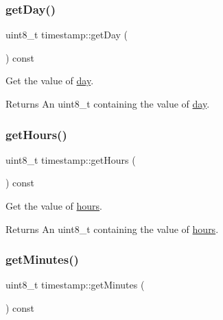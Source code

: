 \subsubsection{\texorpdfstring{get\+Day()}{getDay()}}
{\footnotesize\ttfamily uint8\+\_\+t timestamp\+::get\+Day (\begin{DoxyParamCaption}{ }\end{DoxyParamCaption}) const}



Get the value of \mbox{\hyperlink{classtimestamp_a0102d6c44b2cc194a8186a42ff2bd58b}{day}}. 

\begin{DoxyReturn}{Returns}
An uint8\+\_\+t containing the value of \mbox{\hyperlink{classtimestamp_a0102d6c44b2cc194a8186a42ff2bd58b}{day}}. 
\end{DoxyReturn}
\mbox{\label{classtimestamp_a9857c77d68def8f77737f3c3840b6b95}} 
\subsubsection{\texorpdfstring{get\+Hours()}{getHours()}}
{\footnotesize\ttfamily uint8\+\_\+t timestamp\+::get\+Hours (\begin{DoxyParamCaption}{ }\end{DoxyParamCaption}) const}



Get the value of \mbox{\hyperlink{classtimestamp_a3b2f11626563cca00d60b323ceb15191}{hours}}. 

\begin{DoxyReturn}{Returns}
An uint8\+\_\+t containing the value of \mbox{\hyperlink{classtimestamp_a3b2f11626563cca00d60b323ceb15191}{hours}}. 
\end{DoxyReturn}
\mbox{\label{classtimestamp_a77adde4c8da3bfc1076882f2627938f7}} 
\subsubsection{\texorpdfstring{get\+Minutes()}{getMinutes()}}
{\footnotesize\ttfamily uint8\+\_\+t timestamp\+::get\+Minutes (\begin{DoxyParamCaption}{ }\end{DoxyParamCaption}) const}



